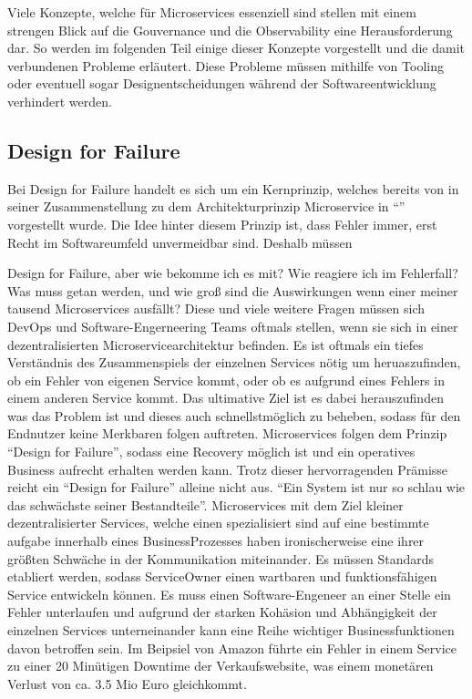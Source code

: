 Viele Konzepte, welche für Microservices essenziell sind stellen mit einem strengen Blick auf die Gouvernance und die Observability eine Herausforderung dar. So werden im folgenden Teil einige dieser Konzepte vorgestellt und die damit verbundenen Probleme erläutert. Diese Probleme müssen mithilfe von Tooling oder eventuell sogar Designentscheidungen während der Softwareentwicklung verhindert werden.

\subsection{Design for Failure}
Bei Design for Failure \autocite{FowlerMicrservices} handelt es sich um ein Kernprinzip, welches bereits von \citeauthor{FowlerMicrservices} in seiner Zusammenstellung zu dem Architekturprinzip Microservice in \enquote{} vorgestellt wurde. Die Idee hinter diesem Prinzip ist, dass Fehler immer, erst Recht im Softwareumfeld unvermeidbar sind. Deshalb müssen 


Design for Failure, aber wie bekomme ich es mit? Wie reagiere ich im Fehlerfall? Was muss getan werden, und wie groß sind die Auswirkungen wenn einer meiner tausend Microservices ausfällt? Diese und viele weitere Fragen müssen sich DevOps und Software-Engerneering Teams oftmals stellen, wenn sie sich in einer dezentralisierten Microservicearchitektur befinden. Es ist oftmals ein tiefes Verständnis des Zusammenspiels der einzelnen Services nötig um heruaszufinden, ob ein Fehler von eigenen Service kommt, oder ob es aufgrund eines Fehlers in einem anderen Service kommt. Das ultimative Ziel ist es dabei herauszufinden was das Problem ist und dieses auch schnellstmöglich zu beheben, sodass für den Endnutzer keine Merkbaren folgen auftreten. Microservices folgen dem Prinzip \enquote{Design for Failure}, sodass eine Recovery möglich ist und ein operatives Business aufrecht erhalten werden kann. Trotz dieser hervorragenden Prämisse reicht ein \enquote{Design for Failure} alleine nicht aus. \enquote{Ein System ist nur so schlau wie das schwächste seiner Bestandteile}. Microservices mit dem Ziel kleiner dezentralisierter Services, welche einen spezialisiert sind auf eine bestimmte aufgabe innerhalb eines BusinessProzesses haben ironischerweise eine ihrer größten Schwäche in der Kommunikation miteinander. Es müssen Standards etabliert werden, sodass ServiceOwner einen wartbaren und funktionsfähigen Service entwickeln können. Es muss einen Software-Engeneer an einer Stelle ein Fehler unterlaufen und aufgrund der starken Kohäsion und Abhängigkeit der einzelnen Services unterneinander kann eine Reihe wichtiger Businessfunktionen davon betroffen sein. Im Beipsiel von Amazon führte ein Fehler in einem Service zu einer 20 Minütigen Downtime der Verkaufswebsite, was einem monetären Verlust von ca. 3.5 Mio Euro gleichkommt.

